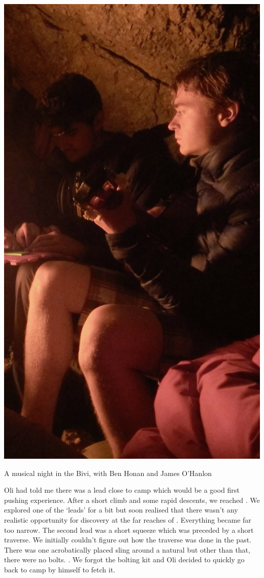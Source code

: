 \begin{marginfigure}
	\includegraphics[width= \linewidth]{images/2015/ben-2015/jarv_ben_bivi.jpg}
	\caption{A musical night in the Bivi, with Ben Honan and James O'Hanlon }
	\label{Falls Road}
\end{marginfigure}


Oli had told me there was a lead close to camp which would be a good first pushing experience. After a short climb and some rapid descents, we reached . We explored one of the `leads' for a bit but soon realised that there wasn't any realistic opportunity for discovery at the far reaches of . Everything became far too narrow. The second lead was a short squeeze which was preceded by a short traverse. We initially couldn't figure out how the traverse was done in the past. There was one acrobatically placed sling around a natural but other than that, there were no bolts. . We forgot the bolting kit and Oli decided to quickly go back to camp by himself to fetch it. 

